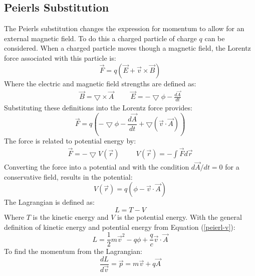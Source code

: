 		\subsection{Peierls Substitution}
			The Peierls substitution changes the expression for momentum to allow for an external magnetic field. To do this a charged particle of charge $q$ can be considered. When a charged particle moves though a magnetic field, the Lorentz force associated with this particle is:
			\begin{equation}
				\vec{F}=q\left(\vec{E}+\vec{v}\times \vec{B}\right)
			\end{equation}
			Where the electric and magnetic field strengths are defined as:
			\begin{align}
			\vec{B}=\bigtriangledown \times \vec{A}\hspace{1cm}\vec{E}=-\bigtriangledown\phi-\frac{d\vec{A}}{dt}
			\end{align}
			Substituting these definitions into the Lorentz force provides:
			\begin{equation}
				\vec{F}=q\left(-\bigtriangledown\phi-\frac{d\vec{A}}{dt}+\bigtriangledown\left(\vec{v}\cdot\vec{A}\right)\right)
			\end{equation}
			The force is related to potential energy by:
			\begin{align}
				\vec{F}=-\bigtriangledown V\left(\vec{r}\right)\hspace{1cm}V\left(\vec{r}\right)=-\int\vec{F}d\vec{r}
			\end{align}
			Converting the force into a potential and with the condition $d\vec{A}/dt=0$ for a conservative field, results in the potential:
			\begin{equation}
				V\left(\vec{r}\right)=q\left(\phi-\vec{v}\cdot\vec{A}\right)
				\label{peierl-v}
			\end{equation}
			The Lagrangian is defined as:
			\begin{equation}
				L=T-V
			\end{equation}
			Where $T$ is the kinetic energy and $V$ is the potential energy. With the general definition of kinetic energy and potential energy from Equation (\ref{peierl-v}):
			\begin{equation}
				L=\frac{1}{2}m\vec{v}^{2}-q\phi+\frac{q}{c}\vec{v}\cdot\vec{A}
				\label{peierl-L}
			\end{equation}
			To find the momentum from the Lagrangian:
			\begin{equation}
				\frac{dL}{d\vec{v}}=\vec{p}=m\vec{v}+q\vec{A}
				\label{lagrangian momentum}
			\end{equation}

